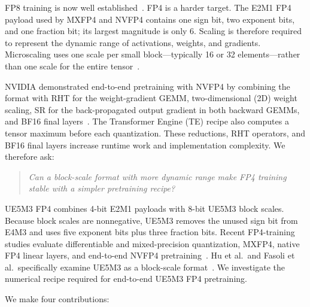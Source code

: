 \documentclass[11pt]{article}
\newcommand{\ue}{UE5M3}
\newcommand{\uefp}{UE5M3 FP4}
\newcommand{\nv}{NVFP4}
\newcommand{\mx}{MXFP4}
\begin{document}
FP8 training is now well established~\citep{micikevicius2022fp8}.  FP4 is a
harder target.  The E2M1 FP4 payload used by \mx{} and \nv{} contains one sign
bit, two exponent bits, and one fraction bit; its largest magnitude is only 6.
Scaling is therefore required to represent the dynamic range of activations,
weights, and gradients.  Microscaling uses one scale per small
block---typically 16 or 32 elements---rather than one scale for the entire tensor~\citep{rouhani2023microexponents,rouhani2023microscaling,ocp2023mx}.

NVIDIA demonstrated end-to-end pretraining with \nv{} by combining the
format with RHT for the weight-gradient GEMM, two-dimensional (2D) weight
scaling, SR for the back-propagated output gradient in both backward GEMMs,
and BF16 final layers~\citep{nvidia2025nvfp4}.  The Transformer Engine
(TE) recipe also computes a tensor maximum before each quantization.  These
reductions, RHT operators, and BF16 final layers increase runtime work and
implementation complexity.  We therefore ask:

\begin{quote}
\emph{Can a block-scale format with more dynamic range make FP4 training
stable with a simpler pretraining recipe?}
\end{quote}

\uefp{} combines 4-bit E2M1 payloads with 8-bit \ue{} block scales.  Because
block scales are nonnegative, \ue{} removes the unused sign bit from E4M3 and
uses five exponent bits plus three fraction bits.  Recent FP4-training studies
evaluate differentiable and mixed-precision quantization, MXFP4, native FP4
linear layers, and end-to-end NVFP4
pretraining~\citep{wang2025optimizing,zhou2025exploring,tseng2025mxfp4,
castro2025quartet,chmiel2025fp4all,nvidia2025nvfp4,panferov2026quartet2,
chen2026tetrajetv2,cook2025fouroversix}.  Hu et al.\ and Fasoli et al.\
specifically examine \ue{} as a block-scale
format~\citep{hu2025designspace,fasoli2026finer}.  We investigate the numerical
recipe required for end-to-end \uefp{} pretraining.

We make four contributions:
\end{document}
